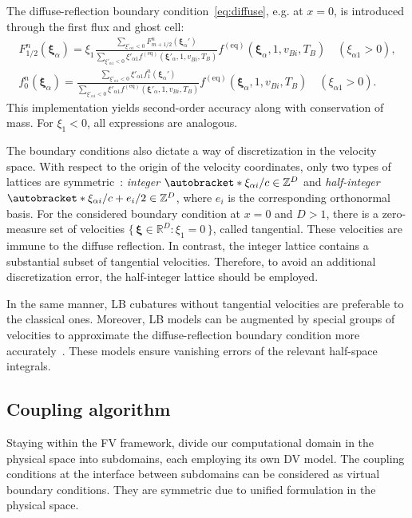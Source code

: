 \documentclass[]{elsarticle} %
\newcommand{\Set}[2]{\{\,{#1}:{#2}\,\}}
\DeclarePairedDelimiter\autobracket()       %
\newcommand{\br}[1]{\autobracket*{#1}}
\newcommand{\bxi}{{\boldsymbol{\xi}}}
\newcommand{\bxia}{\bxi_\alpha}
\newcommand{\xiai}{\xi_{\alpha i}}
\newcommand{\equil}[1]{#1^\mathrm{(eq)}}
\begin{document}
{%
The diffuse-reflection boundary condition~\eqref{eq:diffuse}, e.g. at \(x=0\),
is introduced through the first flux and ghost cell:
\begin{gather}
    F_{1/2}^n(\bxia) = \displaystyle\xi_1\frac{\sum_{\xi'_{\alpha1}<0}F_{m+1/2}^n(\bxia')}
        {\sum_{\xi'_{\alpha1}<0}\xi'_{\alpha1}\equil{f}(\bxi'_\alpha,1,v_{Bi},T_B)}
        \equil{f}(\bxi_\alpha, 1, v_{Bi}, T_B) \quad (\xi_{\alpha1}>0), \label{eq:first_flux}\\
    f_0^n(\bxia) = \displaystyle\frac{\sum_{\xi'_{\alpha1}<0}\xi'_{\alpha1}f_1^n(\bxia')}
        {\sum_{\xi'_{\alpha1}<0}\xi'_{\alpha1}\equil{f}(\bxi'_\alpha,1,v_{Bi},T_B)}
        \equil{f}(\bxi_\alpha, 1, v_{Bi}, T_B) \quad (\xi_{\alpha1}>0). \label{eq:first_ghost}
\end{gather}
This implementation yields second-order accuracy along with conservation of mass.
For \(\xi_1<0\), all expressions are analogous.

The boundary conditions also dictate a way of discretization in the velocity space.
With respect to the origin of the velocity coordinates, only two types of lattices are symmetric~\cite{Inamuro1990}:
\emph{integer} \(\br{\xiai/c} \in \mathbb{Z}^D\) and \emph{half-integer} \(\br{\xiai/c + e_i/2} \in \mathbb{Z}^D\),
where \(e_i\) is the corresponding orthonormal basis.
For the considered boundary condition at \(x=0\) and \(D>1\), there is a zero-measure set of velocities
\(\Set{\bxi\in\mathbb{R}^D}{\xi_1=0}\), called tangential.
These velocities are immune to the diffuse reflection.
In contrast, the integer lattice contains a substantial subset of tangential velocities.
Therefore, to avoid an additional discretization error, the half-integer lattice should be employed.

In the same manner, LB cubatures without tangential velocities are preferable to the classical ones.
Moreover, LB models can be augmented by special groups of velocities to approximate
the diffuse-reflection boundary condition more accurately~\cite{Feuchter2016}.
These models ensure vanishing errors of the relevant half-space integrals.

\subsection{Coupling algorithm}\label{sec:coupling}

Staying within the FV framework, divide our computational domain in the physical space
into subdomains, each employing its own DV model.
The coupling conditions at the interface between subdomains can be considered as virtual boundary conditions.
They are symmetric due to unified formulation in the physical space.

}
\end{document}
